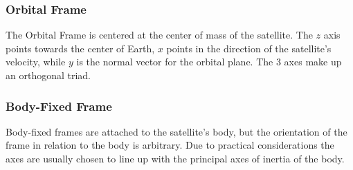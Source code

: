 \subsubsection{Orbital Frame}

The Orbital Frame is centered at the center of mass of the satellite. The $z$ axis points towards the center of Earth, $x$ points in the direction of the satellite's velocity, while $y$ is the normal vector for the orbital plane. The 3 axes make up an orthogonal triad.


\subsubsection{Body-Fixed Frame}

Body-fixed frames are attached to the satellite's body, but the orientation of the frame in relation to the body is arbitrary. Due to practical considerations the axes are usually chosen to line up with the principal axes of inertia of the body.

